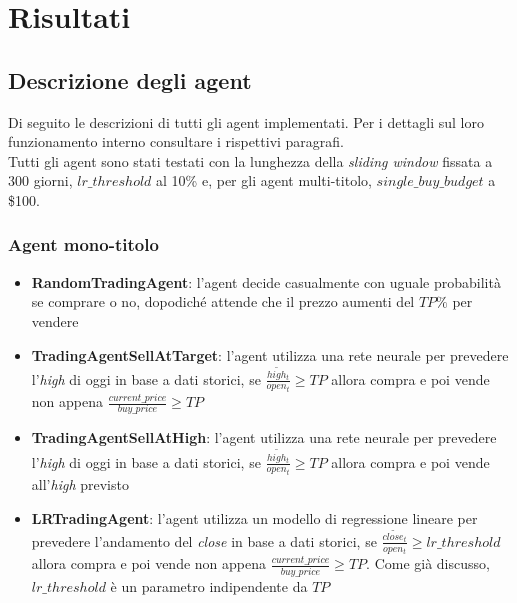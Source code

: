 \documentclass[binding=0.6cm]{sapthesis}
\begin{document}
	\chapter{Risultati}
		\section{Descrizione degli agent}
			Di seguito le descrizioni di tutti gli agent implementati. Per i dettagli sul loro funzionamento interno consultare i rispettivi paragrafi. \\
			Tutti gli agent sono stati testati con la lunghezza della \textit{sliding window} fissata a 300 giorni, $lr\_threshold$ al 10\% e, per gli agent multi-titolo, $single\_buy\_budget$ a \$100.
			\subsection{Agent mono-titolo}
				\begin{itemize}
					\item \textbf{RandomTradingAgent}: l'agent decide casualmente con uguale probabilità se comprare o no, dopodiché attende che il prezzo aumenti del $TP\%$ per vendere
					\item \textbf{TradingAgentSellAtTarget}: l'agent utilizza una rete neurale per prevedere l'\textit{high} di oggi in base a dati storici, se $\frac{\tilde{high_t}}{open_t} \geq TP$ allora compra
						e poi vende non appena $\frac{current\_price}{buy\_price} \geq TP$
					\item \textbf{TradingAgentSellAtHigh}: l'agent utilizza una rete neurale per prevedere l'\textit{high} di oggi in base a dati storici, se $\frac{\tilde{high_t}}{open_t} \geq TP$ allora compra
						e poi vende all'\textit{high} previsto
					\item \textbf{LRTradingAgent}: l'agent utilizza un modello di regressione lineare per prevedere l'andamento del \textit{close} in base a dati storici,
						se $\frac{\tilde{close_t}}{open_t} \geq lr\_threshold$ allora compra e poi vende non appena $\frac{current\_price}{buy\_price} \geq TP$. Come già discusso, $lr\_threshold$ è
						un parametro indipendente da $TP$
				\end{itemize}
\end{document}
